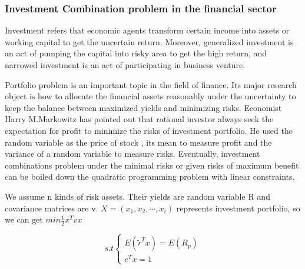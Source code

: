 \documentclass{mcmthesis}
\begin{document}
\subsubsection{Investment Combination problem in the financial sector}
Investment refers that economic agents transform certain income into assets or working capital to get the uncertain return. Moreover, generalized investment is an act of pumping the capital into risky area to get the high return, and narrowed investment is an act of participating in business venture.\par
Portfolio problem is an important topic in the field of finance. Its major research object is how to allocate the financial assets reasonably under the uncertainty to keep the balance between maximized yields and minimizing risks. Economist Harry M.Markowitz has pointed out that rational investor always seek the expectation for profit to minimize the risks of investment portfolio. He used the random variable as the price of stock , its mean to measure profit and the variance of a random variable to measure risks. Eventually, investment combinations problem under the minimal risks or given risks of maximum benefit can be boiled down the quadratic programming problem with linear constraints.\par
We assume n kinds of risk assets. Their yields are random variable R and covariance matrices are v. $X=(x_1,x_2,\cdots,x_i)$ represents investment portfolio, so we can get 
$min \frac{1}{2}x^Tvx$	

\begin{equation}
s.t
\begin{cases}
E(\widetilde r^Tx)=E(R_p)\\
e^Tx=1
\end{cases}
\end{equation}
\end{document}
